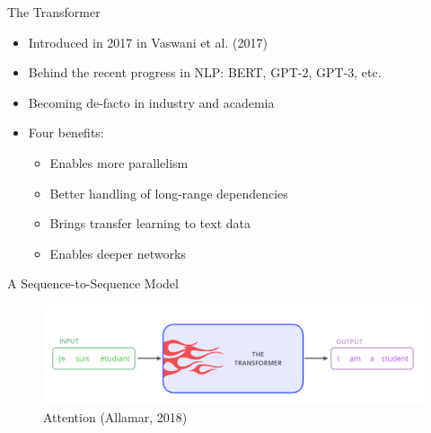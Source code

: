 \documentclass[10pt]{beamer}
\begin{document}
\begin{frame}{The Transformer}

\begin{itemize}
\item Introduced in 2017 in Vaswani et al. (2017)
\item Behind the recent progress in NLP: BERT, GPT-2, GPT-3, etc.
\pause
\item Becoming de-facto  in industry and academia
\pause
\item Four benefits:
\begin{itemize}
\item Enables more {\color{uured} parallelism}
\item Better handling of {\color{uured} long-range dependencies}
\item Brings {\color{uured} transfer learning} to text data
\item Enables {\color{uured} deeper} networks
\end{itemize}
\end{itemize}

\end{frame}



\begin{frame}{A Sequence-to-Sequence Model}

\begin{figure}[h]
\centering
\includegraphics[width=1\textwidth]{fig/alammar_the_transformer_3.png}
\caption{Attention (Allamar, 2018)}
\end{figure}

\end{frame}
\end{document}
